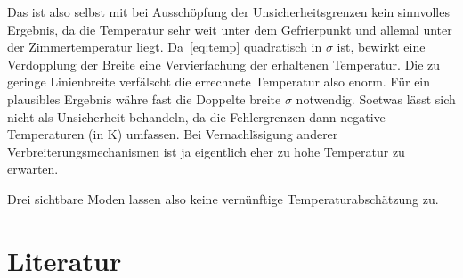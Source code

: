 \documentclass[slug=GL, room=HZDR\ Dresden/Rossendorf\,\ Geb.\ 620/123, supervisor=Tim\ Ziegler]{../../Lab_Report_LaTeX/lab_report}
\begin{document}
Das ist also selbst mit bei Aussch\"opfung der Unsicherheitsgrenzen kein
sinnvolles Ergebnis, da die Temperatur sehr weit unter dem
Gefrierpunkt und allemal unter der Zimmertemperatur
liegt. Da~\ref{eq:temp} quadratisch in \(\sigma\) ist, bewirkt eine
Verdopplung der Breite eine Vervierfachung der erhaltenen
Temperatur. Die zu geringe Linienbreite verf\"alscht die errechnete
Temperatur also enorm. F\"ur ein plausibles Ergebnis w\"ahre fast die
Doppelte breite \(\sigma\) notwendig. Soetwas l\"asst sich nicht als
Unsicherheit behandeln, da die Fehlergrenzen dann negative
Temperaturen (in \si{\kelvin}) umfassen. Bei Vernachl\"ssigung anderer
Verbreiterungsmechanismen ist ja eigentlich eher zu hohe Temperatur zu
erwarten.

Drei sichtbare Moden lassen also keine vern\"unftige
Temperaturabsch\"atzung zu.

\section{Literatur}
\label{sec:literatur}

\printbibliography
\end{document}
